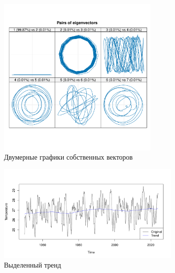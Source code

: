 \documentclass[specialist,
substylefile = spbu.rtx,
               subf,href,colorlinks=true,12pt]{disser}
\theoremstyle{definition}
\begin{document}
\begin{figure}[h!]
	\centering
	\includegraphics[width=0.7\textwidth]{img/Nino_ssa_paired.pdf}
	\caption{Двумерные графики собственных векторов}
	\label{Nino_ssa_paired}
\end{figure}

\begin{figure}[h!]
	\centering
	\includegraphics[width=0.8\textwidth]{img/Nino_reconstruct_trend.pdf}
	\caption{Выделенный тренд}
	\label{Nino_reconstruct_trend}
\end{figure}
\end{document}
